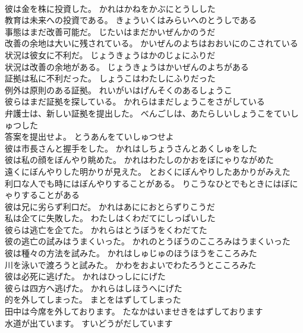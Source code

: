 \documentclass[8pt]{extreport}
\begin{document}
\begin{CJK}{UTF8}{min}
\\	彼は金を株に投資した。	かれはかねをかぶにとうしした 
\\	教育は未来への投資である。	きょういくはみらいへのとうしである 
\\	事態はまだ改善可能だ。	じたいはまだかいぜんかのうだ 
\\	改善の余地は大いに残されている。	かいぜんのよちはおおいにのこされている 
\\	状況は彼女に不利だ。	じょうきょうはかのじょにふりだ 
\\	状況は改善の余地がある。	じょうきょうはかいぜんのよちがある 
\\	証拠は私に不利だった。	しょうこはわたしにふりだった 
\\	例外は原則のある証拠。	れいがいはげんそくのあるしょうこ 
\\	彼らはまだ証拠を探している。	かれらはまだしょうこをさがしている 
\\	弁護士は、新しい証拠を提出した。	べんごしは、あたらしいしょうこをていしゅつした 
\\	答案を提出せよ。	とうあんをていしゅつせよ 
\\	彼は市長さんと握手をした。	かれはしちょうさんとあくしゅをした 
\\	彼は私の顔をぼんやり眺めた。	かれはわたしのかおをぼにゃりながめた 
\\	遠くにぼんやりした明かりが見えた。	とおくにぼんやりしたあかりがみえた 
\\	利口な人でも時にはぼんやりすることがある。	りこうなひとでもときにはぼにゃりすることがある 
\\	彼は兄に劣らず利口だ。	かれはあににおとらずりこうだ 
\\	私は企てに失敗した。	わたしはくわだてにしっぱいした 
\\	彼らは逃亡を企てた。	かれらはとうぼうをくわだてた 
\\	彼の逃亡の試みはうまくいった。	かれのとうぼうのこころみはうまくいった 
\\	彼は種々の方法を試みた。	かれはしゅじゅのほうほうをこころみた 
\\	川を泳いで渡ろうと試みた。	かわをおよいでわたろうとこころみた 
\\	彼は必死に逃げた。	かれはひっしににげた 
\\	彼らは四方へ逃げた。	かれらはしほうへにげた 
\\	的を外してしまった。	まとをはずしてしまった 
\\	田中は今席を外しております。	たなかはいませきをはずしております 
\\	水道が出ています。	すいどうがだしています 

\end{CJK}
\end{document}
